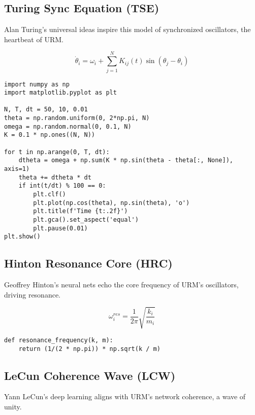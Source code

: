 \documentclass[12pt]{article}
\begin{document}
\subsection{Turing Sync Equation (TSE)}

Alan Turing’s universal ideas inspire this model of synchronized oscillators, the heartbeat of URM.

\begin{equation}
    \dot{\theta}_i = \omega_i + \sum_{j=1}^N K_{ij}(t) \sin(\theta_j - \theta_i)
\end{equation}

\begin{lstlisting}[caption={Turing Sync Simulation}]
import numpy as np
import matplotlib.pyplot as plt

N, T, dt = 50, 10, 0.01
theta = np.random.uniform(0, 2*np.pi, N)
omega = np.random.normal(0, 0.1, N)
K = 0.1 * np.ones((N, N))

for t in np.arange(0, T, dt):
    dtheta = omega + np.sum(K * np.sin(theta - theta[:, None]), axis=1)
    theta += dtheta * dt
    if int(t/dt) % 100 == 0:
        plt.clf()
        plt.plot(np.cos(theta), np.sin(theta), 'o')
        plt.title(f'Time {t:.2f}')
        plt.gca().set_aspect('equal')
        plt.pause(0.01)
plt.show()
\end{lstlisting}

\subsection{Hinton Resonance Core (HRC)}

Geoffrey Hinton’s neural nets echo the core frequency of URM’s oscillators, driving resonance.

\begin{equation}
    \omega_i^{res} = \frac{1}{2\pi} \sqrt{\frac{k_i}{m_i}}
\end{equation}

\begin{lstlisting}[caption={Resonance Frequency}]
def resonance_frequency(k, m):
    return (1/(2 * np.pi)) * np.sqrt(k / m)
\end{lstlisting}

\subsection{LeCun Coherence Wave (LCW)}

Yann LeCun’s deep learning aligns with URM’s network coherence, a wave of unity.
\end{document}
